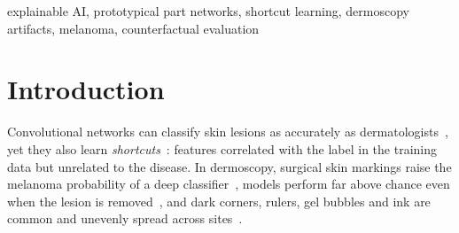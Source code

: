 \documentclass[conference]{IEEEtran}
\begin{document}
\begin{IEEEkeywords}
explainable AI, prototypical part networks, shortcut learning, dermoscopy artifacts, melanoma, counterfactual evaluation
\end{IEEEkeywords}

\section{Introduction}
Convolutional networks can classify skin lesions as accurately as dermatologists~\cite{esteva2017}, yet they also learn \emph{shortcuts}~\cite{geirhos2020}: features correlated with the label in the training data but unrelated to the disease. In dermoscopy, surgical skin markings raise the melanoma probability of a deep classifier~\cite{winkler2019}, models perform far above chance even when the lesion is removed~\cite{bissoto2019,bissoto2020}, and dark corners, rulers, gel bubbles and ink are common and unevenly spread across sites~\cite{bissoto2022,yan2023,pewton2022}.
\end{document}
